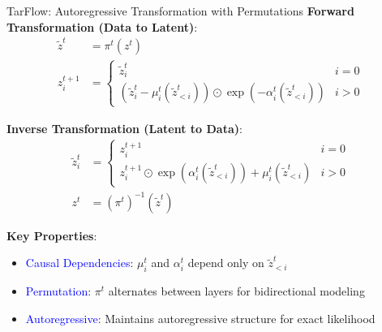 \documentclass[aspectratio=169]{beamer}
\begin{document}
\begin{frame}{TarFlow: Autoregressive Transformation with Permutations}
\textbf{Forward Transformation (Data to Latent)}:
\begin{align}
    \tilde{z}^t &= \pi^t(z^t) \\
    z_i^{t+1} &= \begin{cases}
        \tilde{z}_i^t & i = 0 \\
        (\tilde{z}_i^t - \mu_i^t(\tilde{z}_{<i}^t)) \odot \exp(-\alpha_i^t(\tilde{z}_{<i}^t)) & i > 0
    \end{cases}
\end{align}

\textbf{Inverse Transformation (Latent to Data)}:
\begin{align}
    \tilde{z}_i^t &= \begin{cases}
        z_i^{t+1} & i = 0 \\
        z_i^{t+1} \odot \exp(\alpha_i^t(\tilde{z}_{<i}^t)) + \mu_i^t(\tilde{z}_{<i}^t) & i > 0
    \end{cases} \\
    z^t &= (\pi^t)^{-1}(\tilde{z}^t)
\end{align}

\textbf{Key Properties}:
\begin{itemize}
    \item \textcolor{blue}{Causal Dependencies}: $\mu_i^t$ and $\alpha_i^t$ depend only on $\tilde{z}_{<i}^t$
    \item \textcolor{blue}{Permutation}: $\pi^t$ alternates between layers for bidirectional modeling
    \item \textcolor{blue}{Autoregressive}: Maintains autoregressive structure for exact likelihood
\end{itemize}
\end{frame}
\end{document}

